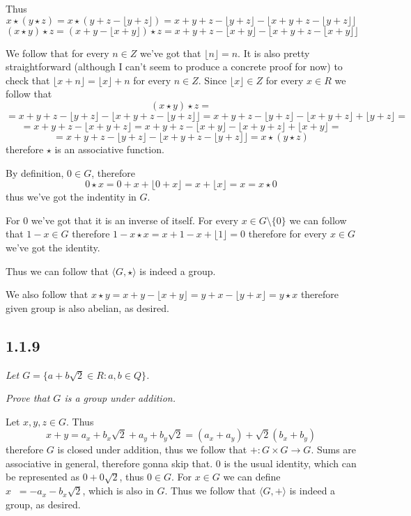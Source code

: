 \documentclass[11pt,oneside,titlepage]{book}
\DeclareMathOperator \inv {^{-1}}
\newcommand{\eangle}[1]{\langle #1 \rangle}
\begin{document}
Thus
$$x \star (y \star z) = x \star (y + z - \lfloor y + z \rfloor )
= x + y + z - \lfloor y + z \rfloor - \lfloor x + y + z - \lfloor y + z \rfloor  \rfloor $$
$$(x \star y) \star z = (x  + y - \lfloor x + y \rfloor) \star z =
x + y + z - \lfloor x + y \rfloor - \lfloor x + y + z - \lfloor x + y \rfloor \rfloor $$

We follow that for every $n \in Z$ we've got that $\lfloor n \rfloor = n$. It is also
pretty straightforward (although I can't seem to produce a concrete proof for now)
to check that $\lfloor x + n \rfloor = \lfloor x \rfloor + n$
for every $n \in Z$. Since $\lfloor x \rfloor \in Z$ for every $x \in R$ we follow that
$$(x \star y) \star z = $$
$$ = x + y + z - \lfloor y + z \rfloor - \lfloor x + y + z - \lfloor y + z \rfloor  \rfloor  =
x + y + z - \lfloor y + z \rfloor - \lfloor x + y + z   \rfloor + \lfloor y + z \rfloor =
$$
$$ =  x + y + z - \lfloor x + y + z   \rfloor = 
x + y + z - \lfloor x + y \rfloor - \lfloor x + y + z \rfloor + \lfloor x + y \rfloor = $$
$$ =  x + y + z - \lfloor y + z \rfloor - \lfloor x + y + z - \lfloor y + z \rfloor  \rfloor =
x \star (y \star z)$$
therefore $\star$ is an associative function.

By definition, $0 \in G$, therefore
$$0 \star x = 0 + x + \lfloor 0 + x \rfloor = x + \lfloor x \rfloor = x = x \star 0$$
thus we've got the indentity in $G$.

For $0$ we've got that it is an inverse of itself. 
For every $x \in G \setminus \{0\}$  we can follow that $1 - x \in G$ therefore
$1 - x \star x = x + 1 - x + \lfloor 1 \rfloor = 0$
therefore for every $x \in G$ we've got the identity.

Thus we can follow that $\eangle{G, \star}$ is indeed a group.

We also follow that $x \star y = x + y - \lfloor x + y \rfloor
= y + x - \lfloor y + x \rfloor  = y \star x$
therefore given group is also abelian, as desired.

\subsection*{1.1.9}

\textit{Let $G = \{a + b \sqrt{2} \in R: a, b \in Q\}$.}

\textit{Prove that $G$ is a group under addition.}

Let $x, y, z \in G$. Thus 
$$x + y = a_x + b_x \sqrt{2}  + a_y + b_y\sqrt{2}  = (a_x + a_y) + \sqrt{2}(b_x + b_y)$$
therefore $G$ is closed under addition, thus we follow that $+: G \times G \to G$.
Sums are associative in general, therefore gonna skip that.
$0$ is the usual identity, which can be represented as $0  + 0 \sqrt{2}$, thus $0 \in G$.
For $x \in G$ we can define $x \inv = -a_x - b_x \sqrt{2}$, which is also in $G$. Thus
we follow that $\eangle{G, +}$ is indeed a group, as desired.
\end{document}
